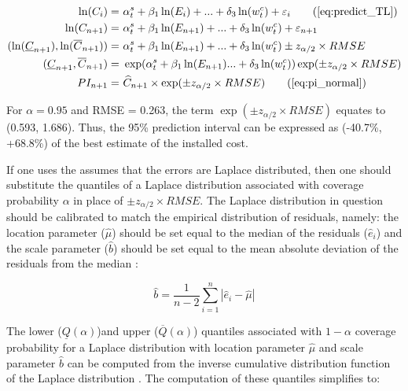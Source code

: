  \begin{align*}
    \ln(C_i) = &~\alpha^{s}_{t} +\beta_1 \ln(E_i) +... + \delta_3 \ln(w^{c}_{t}) + \varepsilon_i \tag{\ref{eq:predict_TL}} \\
    \ln(C_{n+1}) = &~\alpha^{s}_{t} +\beta_1 \ln(E_{n+1}) +... + \delta_3 \ln(w^{c}_{t}) + \varepsilon_{n+1} \notag \\
   (\ln(\underline{C}_{n+1}),\ln(\overline{C}_{n+1}))= &~\alpha^{s}_{t} + \beta_1 \ln(E_{n+1}) + ... + \delta_3 \ln(w^{c}_{t}) \pm z_{\alpha/2} \times RMSE \notag \\
   (\underline{C}_{n+1}, \overline{C}_{n+1}) = &~\exp(\alpha^{s}_{t} +\beta_1 \ln(E_{n+1})  ... + \delta_3 \ln(w^{c}_{t})) \exp(\pm z_{\alpha/2} \times RMSE ) \notag  \\
   PI_{n+1} = &~\widehat{C}_{n+1} \times \exp(\pm z_{\alpha/2} \times RMSE ) \tag{\ref{eq:pi_normal}} \\
\end{align*}

For $\alpha = 0.95$ and RMSE = 0.263, the term $\exp(\pm z_{\alpha/2} \times RMSE)$ equates to (0.593, 1.686). Thus, the 95\% prediction interval can be expressed as (-40.7\%, +68.8\%) of the best estimate of the installed cost.

If one uses the assumes that the errors are Laplace distributed, then one should substitute the quantiles of a Laplace distribution associated with coverage probability $\alpha$ in place of $\pm z_{\alpha/2} \times RMSE$. The Laplace distribution in question should be calibrated to match the empirical distribution of residuals, namely: the location parameter ($\widehat{\mu}$) should be set equal to the median of the residuals ($\widehat{e}_i$) and the scale parameter ($\widehat{b}$) should be set equal to the mean absolute deviation of the residuals from the median \citep{kotz2001}:

\begin{equation}
\widehat{b} = \frac{1}{n-2} \sum^{n}_{i=1}  |\widehat{e}_i - \widehat{\mu}|
\end{equation}

The lower ($\underline{Q}(\alpha)$)and upper ($\overline{Q}(\alpha)$) quantiles associated with $1 - \alpha$ coverage probability for a Laplace distribution with location parameter $\widehat{\mu}$ and scale parameter $\widehat{b}$ can be computed from the inverse cumulative distribution function of the Laplace distribution \citep{kotz2001}. The computation of these quantiles simplifies to:

